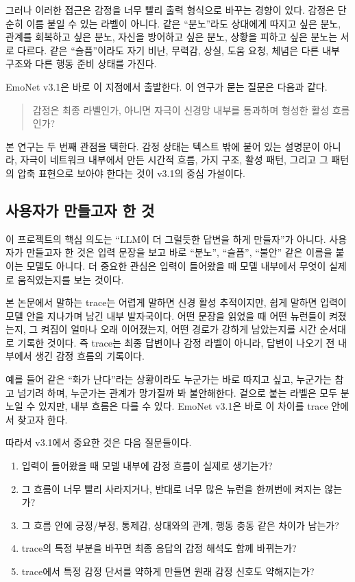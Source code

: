 \documentclass[11pt,a4paper]{article}
\begin{document}
그러나 이러한 접근은 감정을 너무 빨리 출력 형식으로 바꾸는 경향이 있다. 감정은 단순히 이름 붙일 수 있는 라벨이 아니다. 같은 ``분노''라도 상대에게 따지고 싶은 분노, 관계를 회복하고 싶은 분노, 자신을 방어하고 싶은 분노, 상황을 피하고 싶은 분노는 서로 다르다. 같은 ``슬픔''이라도 자기 비난, 무력감, 상실, 도움 요청, 체념은 다른 내부 구조와 다른 행동 준비 상태를 가진다.

EmoNet v3.1은 바로 이 지점에서 출발한다. 이 연구가 묻는 질문은 다음과 같다.

\begin{quote}
감정은 최종 라벨인가, 아니면 자극이 신경망 내부를 통과하며 형성한 활성 흐름인가?
\end{quote}

본 연구는 두 번째 관점을 택한다. 감정 상태는 텍스트 밖에 붙어 있는 설명문이 아니라, 자극이 네트워크 내부에서 만든 시간적 흐름, 가지 구조, 활성 패턴, 그리고 그 패턴의 압축 표현으로 보아야 한다는 것이 v3.1의 중심 가설이다.

\subsection{사용자가 만들고자 한 것}

이 프로젝트의 핵심 의도는 ``LLM이 더 그럴듯한 답변을 하게 만들자''가 아니다. 사용자가 만들고자 한 것은 입력 문장을 보고 바로 ``분노'', ``슬픔'', ``불안'' 같은 이름을 붙이는 모델도 아니다. 더 중요한 관심은 입력이 들어왔을 때 모델 내부에서 무엇이 실제로 움직였는지를 보는 것이다.

본 논문에서 말하는 trace는 어렵게 말하면 신경 활성 추적이지만, 쉽게 말하면 입력이 모델 안을 지나가며 남긴 내부 발자국이다. 어떤 문장을 읽었을 때 어떤 뉴런들이 켜졌는지, 그 켜짐이 얼마나 오래 이어졌는지, 어떤 경로가 강하게 남았는지를 시간 순서대로 기록한 것이다. 즉 trace는 최종 답변이나 감정 라벨이 아니라, 답변이 나오기 전 내부에서 생긴 감정 흐름의 기록이다.

예를 들어 같은 ``화가 난다''라는 상황이라도 누군가는 바로 따지고 싶고, 누군가는 참고 넘기려 하며, 누군가는 관계가 망가질까 봐 불안해한다. 겉으로 붙는 라벨은 모두 분노일 수 있지만, 내부 흐름은 다를 수 있다. EmoNet v3.1은 바로 이 차이를 trace 안에서 찾고자 한다.

따라서 v3.1에서 중요한 것은 다음 질문들이다.

\begin{enumerate}
  \item 입력이 들어왔을 때 모델 내부에 감정 흐름이 실제로 생기는가?
  \item 그 흐름이 너무 빨리 사라지거나, 반대로 너무 많은 뉴런을 한꺼번에 켜지는 않는가?
  \item 그 흐름 안에 긍정/부정, 통제감, 상대와의 관계, 행동 충동 같은 차이가 남는가?
  \item trace의 특정 부분을 바꾸면 최종 응답의 감정 해석도 함께 바뀌는가?
  \item trace에서 특정 감정 단서를 약하게 만들면 원래 감정 신호도 약해지는가?
\end{enumerate}
\end{document}
